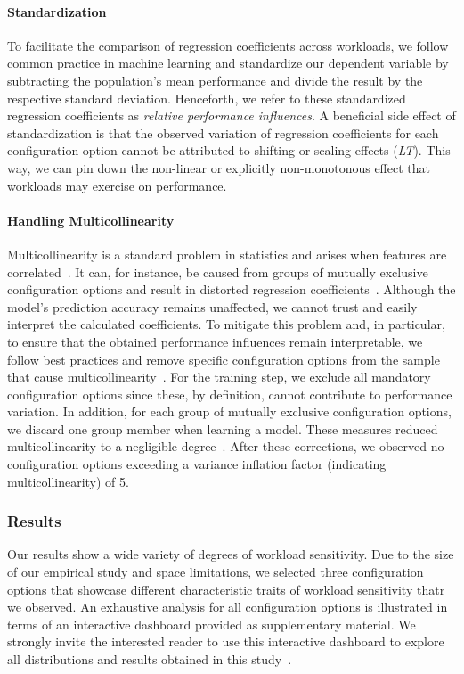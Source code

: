 {{{\paragraph*{Standardization}
To facilitate the comparison of regression coefficients across workloads, we follow common practice in machine learning and standardize our dependent variable by subtracting the population’s mean performance and divide the result by the respective standard deviation. Henceforth, we refer to these standardized regression coefficients as \textit{relative performance influences}. A beneficial side effect of standardization is that the observed variation of regression coefficients for each configuration option cannot be attributed to shifting or scaling effects (\colorbox{lt-color!60}{\textit{LT}}). This way, we can pin down  the non-linear or explicitly non-monotonous effect that workloads may exercise on performance.
\paragraph*{Handling Multicollinearity} Multicollinearity is a standard problem in statistics and arises when features are correlated~\cite{Daoud_2017}. It can, for instance, be caused from groups of mutually exclusive configuration options and result in distorted regression coefficients~\cite{dorn2020}. Although the model's prediction accuracy remains unaffected, we cannot trust and easily interpret the calculated coefficients. To mitigate this problem and, in particular, to ensure that the obtained performance influences remain interpretable, we follow best practices and remove specific configuration options from the sample that cause multicollinearity~\cite{dorn2020}. For the training step, we exclude all mandatory configuration options since these, by definition, cannot contribute to performance variation. In addition, for each group of mutually exclusive configuration options, we discard one group member when learning a model. These measures reduced multicollinearity to a negligible degree~\cite{o2007caution}.  After these corrections, we observed no configuration options exceeding a variance inflation factor (indicating multicollinearity) of 5.


\subsubsection{Results}\label{sec:results2}


	
Our results show a wide variety of degrees of workload sensitivity. Due to the size of our empirical study and space limitations, we selected three configuration options that showcase different characteristic traits of workload sensitivity thatr we observed. An exhaustive analysis for all configuration options is illustrated in terms of an interactive dashboard provided as supplementary material. We strongly invite the interested reader to use this interactive dashboard to explore all distributions and results obtained in this study~\cite{muhlbauer_workload_2023_companion}.

}}}
